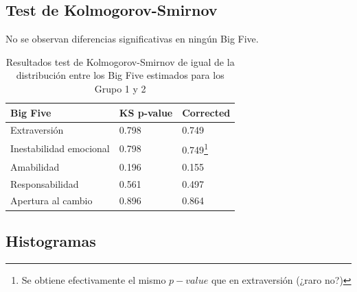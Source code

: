 \documentclass[12pt]{article}%
\begin{document}
\subsection{Test de Kolmogorov-Smirnov}
No se observan diferencias significativas en ningún Big Five.
\begin{table}[htpb]
	\centering
	\caption{Resultados test de Kolmogorov-Smirnov de igual de la distribución entre los Big Five estimados para los Grupo 1 y 2}
	\label{my-label}
	\begin{tabular}{lll}
		\toprule\toprule
		Big Five                & KS p-value & Corrected\\
		\midrule
		Extraversión            & 0.798&0.749          \\
		Inestabilidad emocional & 0.798&0.749\footnote{Se obtiene efectivamente el mismo $p-value$ que en extraversión (¿raro no?)}           \\
		Amabilidad              & 0.196 & 0.155           \\
		Responsabilidad         & 0.561 &    0.497         \\
		Apertura al cambio      & 0.896 & 0.864   \\
		\bottomrule \bottomrule   
	\end{tabular}
\end{table}

\subsection{Histogramas}
\end{document}
